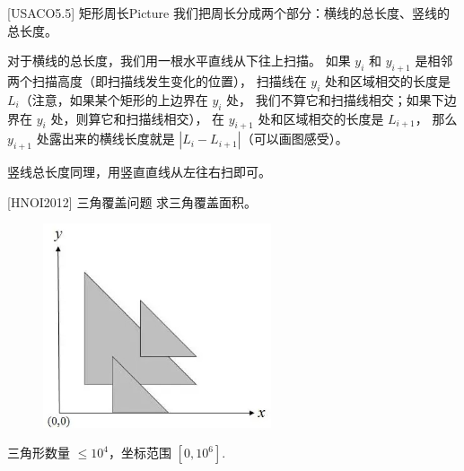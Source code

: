 \documentclass{beamer}
\begin{document}
\begin{frame}{[USACO5.5] 矩形周长Picture}
    \small
    我们把周长分成两个部分：横线的总长度、竖线的总长度。

    \vspace{1em}\pause
    对于横线的总长度，我们用一根水平直线从下往上扫描。
    如果 $y_i$ 和 $y_{i+1}$ 是相邻两个扫描高度（即扫描线发生变化的位置），
    扫描线在 $y_i$ 处和区域相交的长度是 $L_i$（注意，如果某个矩形的上边界在 $y_i$ 处，
    我们不算它和扫描线相交；如果下边界在 $y_i$ 处，则算它和扫描线相交），
    在 $y_{i+1}$ 处和区域相交的长度是 $L_{i+1}$，
    那么 $y_{i+1}$ 处露出来的横线长度就是 $|L_i-L_{i+1}|$（可以画图感受）。

    \vspace{1em}\pause
    竖线总长度同理，用竖直直线从左往右扫即可。
\end{frame}

\begin{frame}{[HNOI2012] 三角覆盖问题}
    \small
    求三角覆盖面积。
    
    \begin{figure}[H]
        \centering
        \includegraphics[width=0.6\textwidth]{pic/hnoi2012.png}
    \end{figure}
    
    三角形数量 $\leq 10^4$，坐标范围 $[0,10^6]$.
\end{frame}
\end{document}
